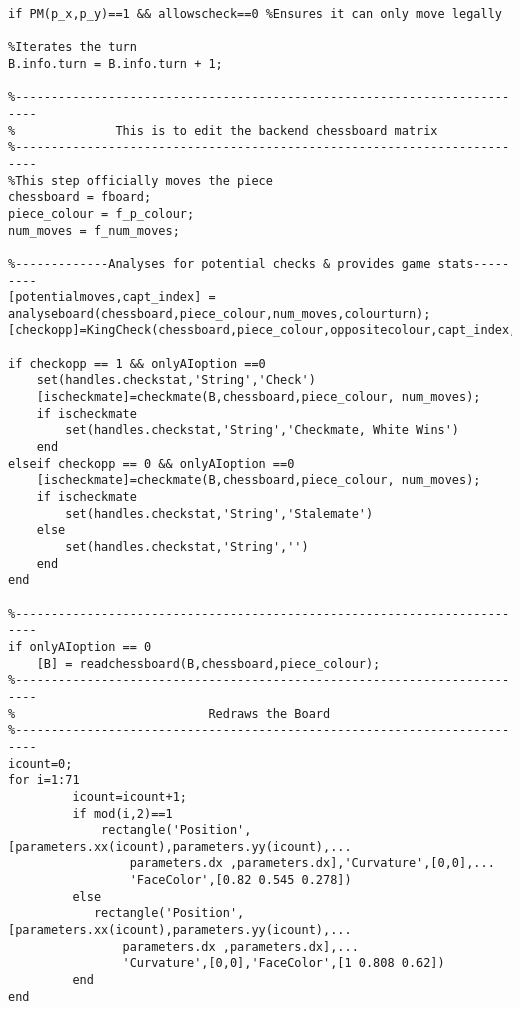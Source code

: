 \documentclass{article}
\begin{document}
\begin{lstlisting}
if PM(p_x,p_y)==1 && allowscheck==0 %Ensures it can only move legally
    
%Iterates the turn
B.info.turn = B.info.turn + 1;

%-------------------------------------------------------------------------
%              This is to edit the backend chessboard matrix
%-------------------------------------------------------------------------
%This step officially moves the piece
chessboard = fboard;
piece_colour = f_p_colour; 
num_moves = f_num_moves;

%-------------Analyses for potential checks & provides game stats---------
[potentialmoves,capt_index] = analyseboard(chessboard,piece_colour,num_moves,colourturn);
[checkopp]=KingCheck(chessboard,piece_colour,oppositecolour,capt_index,potentialmoves);

if checkopp == 1 && onlyAIoption ==0
    set(handles.checkstat,'String','Check')
    [ischeckmate]=checkmate(B,chessboard,piece_colour, num_moves);
    if ischeckmate
        set(handles.checkstat,'String','Checkmate, White Wins')
    end
elseif checkopp == 0 && onlyAIoption ==0
    [ischeckmate]=checkmate(B,chessboard,piece_colour, num_moves);
    if ischeckmate
        set(handles.checkstat,'String','Stalemate')
    else
        set(handles.checkstat,'String','')
    end
end

%-------------------------------------------------------------------------
if onlyAIoption == 0
    [B] = readchessboard(B,chessboard,piece_colour);
%-------------------------------------------------------------------------
%                           Redraws the Board
%-------------------------------------------------------------------------
icount=0;
for i=1:71
         icount=icount+1;
         if mod(i,2)==1
             rectangle('Position',[parameters.xx(icount),parameters.yy(icount),...
                 parameters.dx ,parameters.dx],'Curvature',[0,0],...
                 'FaceColor',[0.82 0.545 0.278])
         else
            rectangle('Position',[parameters.xx(icount),parameters.yy(icount),...
                parameters.dx ,parameters.dx],...
                'Curvature',[0,0],'FaceColor',[1 0.808 0.62])             
         end
end


\end{lstlisting}
\end{document}
